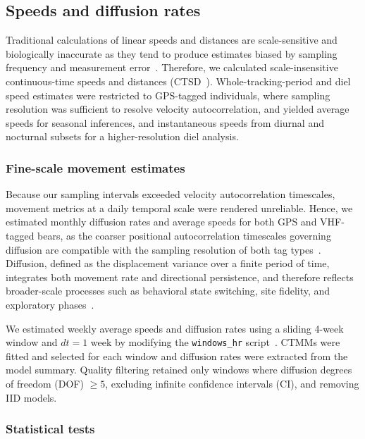 \documentclass[lineno,referee,pdflatex,sn-vancouver-num]{sn-jnl}%
\theoremstyle{thmstyleone}%
\theoremstyle{thmstyletwo}%
\theoremstyle{thmstylethree}%
\begin{document}
\subsection{Speeds and diffusion rates}

Traditional calculations of linear speeds and distances are scale-sensitive and biologically inaccurate as they tend to produce estimates biased by sampling frequency and measurement error~\cite{noonanScaleinsensitiveEstimationSpeed2019}. Therefore, we calculated scale-insensitive continuous-time speeds and distances (CTSD~\cite{noonanScaleinsensitiveEstimationSpeed2019}). Whole-tracking-period and diel speed estimates were restricted to GPS-tagged individuals, where sampling resolution was sufficient to resolve velocity autocorrelation, and yielded average speeds for seasonal inferences, and instantaneous speeds from diurnal and nocturnal subsets for a higher-resolution diel analysis.

\subsubsection{Fine-scale movement estimates}

Because our sampling intervals exceeded velocity autocorrelation timescales, movement metrics at a daily temporal scale were rendered unreliable. Hence, we estimated monthly diffusion rates and average speeds for both GPS and VHF-tagged bears, as the coarser positional autocorrelation timescales governing diffusion are compatible with the sampling resolution of both tag types~\cite{denicolaAreYourData2025}.
Diffusion, defined as the displacement variance over a finite period of time, integrates both movement rate and directional persistence, and therefore reflects broader-scale processes such as behavioral state switching, site fidelity, and exploratory phases~\cite{denicolaAreYourData2025}.

We estimated weekly average speeds and diffusion rates using a sliding 4-week window and $dt = 1$ week by modifying the \texttt{windows\_hr} script~\cite{mezziniHowResourceAbundance2025}. CTMMs were fitted and selected for each window and diffusion rates were extracted from the model summary. Quality filtering retained only windows where diffusion degrees of freedom (DOF) $\geq 5$, excluding infinite confidence intervals (CI), and removing IID models.

\subsubsection{Statistical tests}
\end{document}
